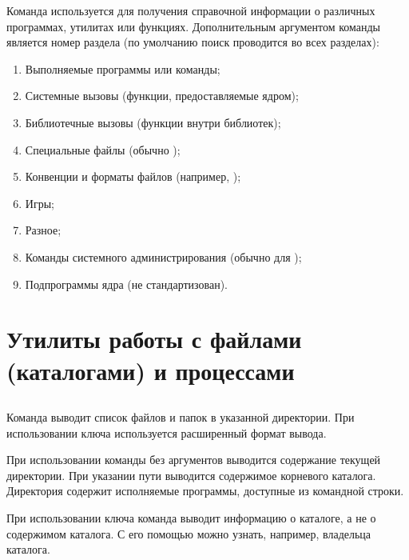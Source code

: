 Команда  используется для получения справочной информации о различных программах, утилитах или функциях. Дополнительным аргументом команды является номер раздела (по умолчанию поиск проводится во всех разделах):
\begin{enumerate}
	\item Выполняемые программы или  команды;
	\item Системные вызовы (функции, предоставляемые ядром);
	\item Библиотечные вызовы (функции внутри библиотек);
	\item Специальные файлы (обычно );
	\item Конвенции и форматы файлов (например, );
	\item Игры;
	\item Разное;
	\item Команды системного администрирования (обычно для );
	\item Подпрограммы ядра (не стандартизован).
\end{enumerate}


\section{Утилиты работы с файлами (каталогами) и процессами}

\subsection{}

Команда  выводит список файлов и папок в указанной директории. При использовании ключа  используется расширенный формат вывода.


При использовании команды  без аргументов выводится содержание текущей директории. При указании пути  выводится содержимое корневого каталога. Директория  содержит исполняемые программы, доступные из командной строки.


При использовании ключа  команда выводит информацию о каталоге, а не о содержимом каталога. С его помощью можно узнать, например, владельца каталога.


\subsection{}

